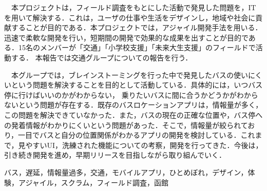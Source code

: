 \documentclass[openany,11pt,papersize,dvipdfm]{jsbook}
\begin{document}
\maketitle

\frontmatter

\begin{jabstract}
　本プロジェクトは，フィールド調査をもとにした活動で発見した問題を，IT を用いて解決する．これは，ユーザの仕事や生活をデザインし，地域や社会に貢献することが目的である．本プロジェクトでは，アジャイル開発手法を用いる．迅速で柔軟な開発を行い，短期間の開発で効果的な成果を出すことが目的である．15名のメンバーが「交通」「小学校支援」「未来大生支援」のフィールドで活動する． 本報告では交通グループについての報告を行う．

　本グループでは，ブレインストーミングを行った中で発見したバスの使いにくいという問題を解決することを目的として活動している．具体的には，いつバス停に行けばいいのかがわからない， 乗りたいバスに間に合うかどうかがわからないという問題が存在する．既存のバスロケーションアプリは，情報量が多く，この問題を解決できていなかった．また，バスの現在の正確な位置や，バス停への発着情報がわかりにくいという問題があった．そこで，情報量が絞られており，一目でバスと自分の位置関係がわかるアプリの開発を検討している．これまで，見やすいUI，洗練された機能についての考察，開発を行ってきた．今後は，引き続き開発を進め，早期リリースを目指しながら取り組んでいく．
\begin{jkeyword}
バス，遅延，情報量過多，交通，モバイルアプリ，ひとめぼれ，デザイン，体験，アジャイル，スクラム，フィールド調査，函館
\end{jkeyword}
\end{jabstract}
\end{document}
